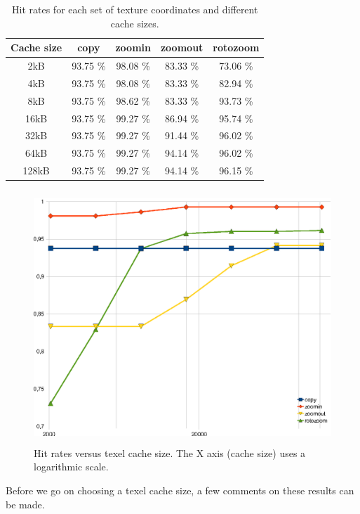 \documentclass[a4paper,11pt]{kthesis}
\begin{document}
\begin{table}
\centering
\begin{tabular}{|c|c|c|c|c|}
\hline
\textbf{Cache size} & \textbf{copy} & \textbf{zoomin} & \textbf{zoomout} & \textbf{rotozoom} \\
\hline
2kB & 93.75 \% & 98.08 \% & 83.33 \% & 73.06 \% \\
\hline
4kB & 93.75 \% & 98.08 \% & 83.33 \% & 82.94 \% \\
\hline
8kB & 93.75 \% & 98.62 \% & 83.33 \% & 93.73 \% \\
\hline
16kB & 93.75 \% & 99.27 \% & 86.94 \% & 95.74 \% \\
\hline
32kB & 93.75 \% & 99.27 \% & 91.44 \% & 96.02 \% \\
\hline
64kB & 93.75 \% & 99.27 \% & 94.14 \% & 96.02 \% \\
\hline
128kB & 93.75 \% & 99.27 \% & 94.14 \% & 96.15 \% \\
\hline
\end{tabular}
\caption{Hit rates for each set of texture coordinates and different cache sizes.}\label{tab:tcresults}
\end{table}

\begin{figure}[htp]
\centering
\includegraphics[height=95mm]{tcresultsgraph.eps}
\caption{Hit rates versus texel cache size. The X axis (cache size) uses a logarithmic scale.}
\label{fig:tcresultsgraph}
\end{figure}

Before we go on choosing a texel cache size, a few comments on these results can be made.
\end{document}
